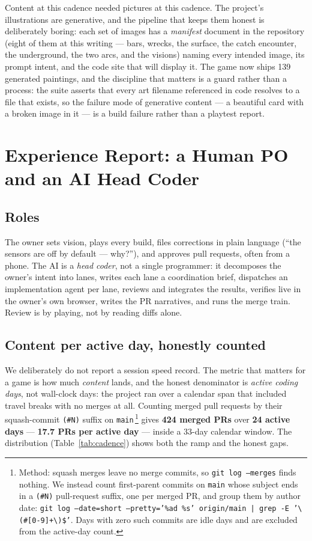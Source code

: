 \documentclass[10pt,twocolumn]{article}
\begin{document}
Content at this cadence needed pictures at this cadence. The project's illustrations are
generative, and the pipeline that keeps them honest is deliberately boring: each set of images
has a \emph{manifest} document in the repository (eight of them at this writing --- bars,
wrecks, the surface, the catch encounter, the underground, the two arcs, and the visions)
naming every intended image, its prompt intent, and the code site that will display it. The
game now ships 139 generated paintings, and the discipline that matters is a guard rather than
a process: the suite asserts that every art filename referenced in code resolves to a file
that exists, so the failure mode of generative content --- a beautiful card with a broken
image in it --- is a build failure rather than a playtest report.

\section{Experience Report: a Human PO and an AI Head Coder}
\label{sec:process}

\subsection{Roles}

The owner sets vision, plays every build, files corrections in plain language (``the
sensors are off by default --- why?''), and approves pull requests, often from a phone. The
AI is a \emph{head coder}, not a single programmer: it decomposes the owner's intent into
lanes, writes each lane a coordination brief, dispatches an implementation agent per lane,
reviews and integrates the results, verifies live in the owner's own browser, writes the PR
narratives, and runs the merge train. Review is by playing, not by reading diffs alone.

\subsection{Content per active day, honestly counted}
\label{sec:cadence}

We deliberately do not report a session speed record. The metric that matters for a game is
how much \emph{content} lands, and the honest denominator is \emph{active coding days}, not
wall-clock days: the project ran over a calendar span that included travel breaks with no
merges at all. Counting merged pull requests by their squash-commit
\texttt{(\#N)} suffix on \texttt{main}\,\footnote{Method: squash merges leave no merge
commits, so \texttt{git log --merges} finds nothing. We instead count first-parent commits
on \texttt{main} whose subject ends in a \texttt{(\#N)} pull-request suffix, one per merged
PR, and group them by author date:
\texttt{git log --date=short --pretty='\%ad \%s' origin/main | grep -E '\textbackslash(\#[0-9]+\textbackslash)\$'}.
Days with zero such commits are idle days and are excluded from the active-day count.}
gives \textbf{424 merged PRs} over \textbf{24 active days} --- \textbf{17.7 PRs per active
day} --- inside a 33-day calendar window. The distribution (Table~\ref{tab:cadence}) shows
both the ramp and the honest gaps.
\end{document}
